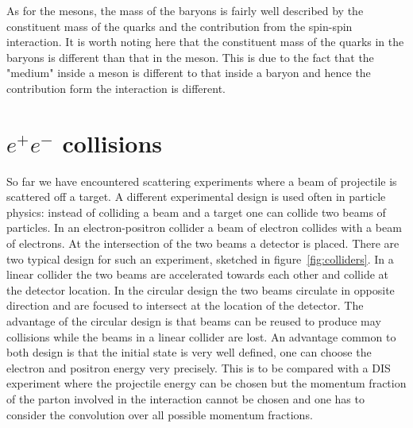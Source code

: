 \documentclass[12pt]{article}
\begin{document}
As for the mesons, the mass of the baryons is fairly well described by the constituent mass of the quarks and the contribution from the spin-spin interaction. It is worth noting here that the constituent mass of the quarks in the baryons is different than that in the meson.
This is due to the fact that the "medium" inside a meson is different to that inside a baryon and hence the contribution form the interaction is different. 

\clearpage
\section{$e^+e^-$ collisions}
So far we have encountered scattering experiments where a beam of projectile is scattered off a target. A different experimental design is used often in particle physics: instead of colliding a beam and a target one can collide two beams of particles. In an electron-positron collider a beam of electron collides with a beam of electrons. At the intersection of the two beams a detector is placed. There are two typical design for such an experiment, sketched in figure~\ref{fig:colliders}. In a linear collider the two beams are accelerated towards each other and collide at the detector location. In the circular design the two beams circulate in opposite direction and are focused to intersect at the location of the detector. The advantage of the circular design is that beams can be reused to produce may collisions while the beams in a linear collider are lost. An advantage common to both design is that the initial state is very well defined, one can choose the electron and positron energy very precisely. This is to be compared with a DIS experiment where the projectile energy can be chosen but the momentum fraction of the parton involved in the interaction cannot be chosen and one has to consider the convolution over all possible momentum fractions.   
\end{document}

